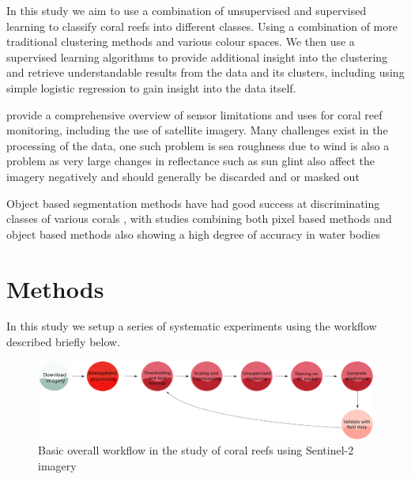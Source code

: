 \documentclass[journal,article,submit,pdftex,moreauthors]{Definitions/mdpi}
\begin{document}
In this study we aim to use a combination of unsupervised and supervised learning to classify coral reefs into different classes. Using a combination of more traditional clustering methods and various colour spaces. We then use a supervised learning algorithms to provide additional insight into the clustering and 
retrieve understandable results from the data and its clusters, including using simple logistic regression to gain insight into the data itself.

\citep{Hedley2016} provide a comprehensive overview of sensor limitations and uses for coral reef monitoring, including the use of satellite imagery. Many challenges exist in the processing of the data, one such problem is 
sea roughness due to wind is also a problem as very large changes in reflectance such as sun glint also affect the imagery negatively  and should generally be discarded and or masked out \cite{gordon1997atmospheric}

Object based segmentation methods have had good success at discriminating classes of various corals \cite{Nguyen2021}, with studies combining both pixel based methods and object based methods 
also showing a high degree of accuracy in water bodies \cite{huang2015combining}


\section{Methods}
In this study we setup a series of systematic experiments using the workflow described briefly below. 

\begin{figure}
	\includegraphics[width=\linewidth]{Images/Flow_Chart.png}
	\caption{Basic overall workflow in the study of coral reefs using Sentinel-2 imagery}
	\label{fig:workflow}
\end{figure}
\end{document}
